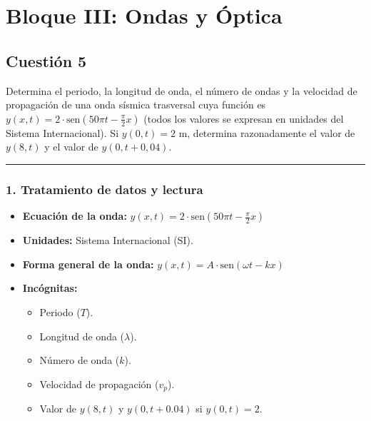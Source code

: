 \newpage

\section{Bloque III: Ondas y Óptica}
\label{sec:ondasopt_2023_jul_ord}

\subsection{Cuestión 5}
\label{subsec:C5_2023_jul_ord}

\begin{cajaenunciado}
Determina el periodo, la longitud de onda, el número de ondas y la velocidad de propagación de una onda sísmica trasversal cuya función es $y(x,t)=2\cdot\text{sen}(50\pi t - \frac{\pi}{2}x)$ (todos los valores se expresan en unidades del Sistema Internacional). Si $y(0,t)=2$ m, determina razonadamente el valor de $y(8,t)$ y el valor de $y(0, t+0,04)$.
\end{cajaenunciado}
\hrule

\subsubsection*{1. Tratamiento de datos y lectura}
\begin{itemize}
    \item \textbf{Ecuación de la onda:} $y(x,t)=2\cdot\text{sen}(50\pi t - \frac{\pi}{2}x)$
    \item \textbf{Unidades:} Sistema Internacional (SI).
    \item \textbf{Forma general de la onda:} $y(x,t) = A \cdot \text{sen}(\omega t - kx)$
    \item \textbf{Incógnitas:}
    \begin{itemize}
        \item Periodo ($T$).
        \item Longitud de onda ($\lambda$).
        \item Número de onda ($k$).
        \item Velocidad de propagación ($v_p$).
        \item Valor de $y(8,t)$ y $y(0,t+0.04)$ si $y(0,t)=2$.
    \end{itemize}
\end{itemize}

